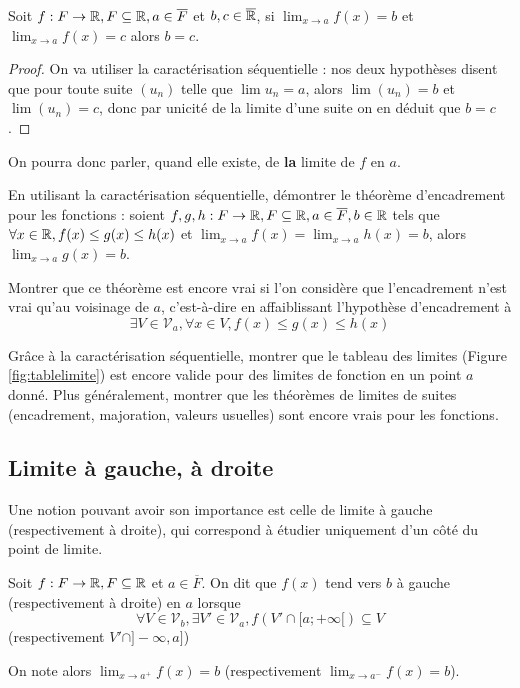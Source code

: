 \begin{prop}
    Soit $f : F\to\mathbb{R},F\subseteq\mathbb{R},a\in\overline F$ et $b,c\in\overline{\mathbb{R}}$, si $\displaystyle{\lim_{x\to a} f(x) = b}$ et $\displaystyle{\lim_{x\to a} f(x) = c}$ alors $b=c$.
\end{prop}

\begin{proof}
    On va utiliser la caractérisation séquentielle : nos deux hypothèses disent que pour toute suite $(u_n)$ telle que $\lim u_n = a$, alors $\lim (u_n) = b$ et $\lim (u_n) = c$, donc par unicité de la limite d'une suite on en déduit que $b = c$.
\end{proof}

On pourra donc parler, quand elle existe, de \textbf{la} limite de $f$ en $a$.

\begin{exo}
    En utilisant la caractérisation séquentielle, démontrer le théorème d'encadrement pour les fonctions : soient $f,g,h : F\to\mathbb{R},F\subseteq \mathbb{R},a\in\overline F, b\in\mathbb{R}$ tels que $\forall x\in\mathbb{R}, f(x)\leq g(x)\leq h(x)$ et $\displaystyle{\lim_{x\to a} f(x) = \lim_{x\to a} h(x) = b}$, alors $\displaystyle{\lim_{x\to a} g(x) = b}$.

    Montrer que ce théorème est encore vrai si l'on considère que l'encadrement n'est vrai qu'au voisinage de $a$, c'est-à-dire en affaiblissant l'hypothèse d'encadrement à $$\exists V\in\mathcal V_a, \forall x \in V, f(x)\leq g(x)\leq h(x)$$
\end{exo}

\begin{exo}
    Grâce à la caractérisation séquentielle, montrer que le tableau des limites (Figure \ref{fig:tablelimite}) est encore valide pour des limites de fonction en un point $a$ donné. Plus généralement, montrer que les théorèmes de limites de suites (encadrement, majoration, valeurs usuelles) sont encore vrais pour les fonctions.
\end{exo}

\subsection{Limite à gauche, à droite}

Une notion pouvant avoir son importance est celle de limite à gauche (respectivement à droite), qui correspond à étudier uniquement d'un côté du point de limite.

\begin{defi}
    Soit $f : F \to\mathbb{R},F\subseteq\mathbb{R}$ et $a\in\overline F$. On dit que $f(x)$ tend vers $b$ à gauche (respectivement à droite) en $a$ lorsque $$\forall V\in\mathcal V_b, \exists V'\in\mathcal V_a, f(V'\cap [a;+\infty[)\subseteq V$$ (respectivement $V'\cap ]-\infty,a]$)

    On note alors $\displaystyle{\lim_{x\to a^+}f(x)=b}$ (respectivement $\displaystyle{\lim_{x\to a^-}f(x)=b}$).
\end{defi}

